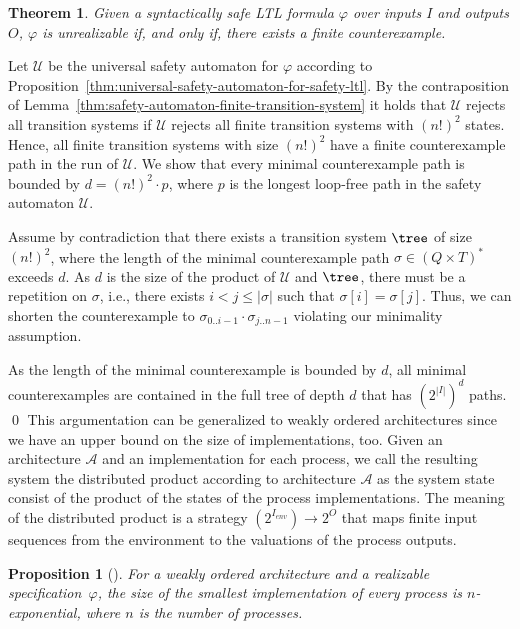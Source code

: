 \documentclass{LMCS}
\theoremstyle{plain}\newtheorem{theorem}[thm]{Theorem}
\theoremstyle{plain}\newtheorem{lemma}[thm]{Lemma}
\theoremstyle{plain}\newtheorem{proposition}[thm]{Proposition}
\theoremstyle{plain}\newtheorem{corollary}[thm]{Corollary}
\theoremstyle{definition}\newtheorem{definition}{Definition}[section]
\begin{document}
\begin{theorem} \label{thm:completeness_full_informed_synthesis}
  Given a syntactically safe LTL formula $\varphi$ over inputs $I$ and outputs $O$, $\varphi$ is unrealizable if, and only if, there exists a finite counterexample.
\end{theorem}
\proof
  Let $\mathcal{U}$ be the universal safety automaton for $\varphi$
  according to Proposition~\ref{thm:universal-safety-automaton-for-safety-ltl}.
  By the contraposition of Lemma~\ref{thm:safety-automaton-finite-transition-system} it holds that $\mathcal{U}$ rejects all transition systems if $\mathcal{U}$ rejects all finite transition systems with $(n!)^2$ states.
  Hence, all finite transition systems with size $(n!)^2$ have a finite counterexample path in the run of $\mathcal{U}$.
  We show that every minimal counterexample path is bounded by $d = (n!)^2 \cdot p$, where $p$ is the longest loop-free path in the safety automaton $\mathcal{U}$.
  
  Assume by contradiction that there exists a transition system $\tree$ of size $(n!)^2$, where the length of the minimal counterexample path $\sigma \in (Q \times T)^*$ exceeds $d$.
  As $d$ is the size of the product of $\mathcal{U}$ and $\tree$, there must be a repetition on $\sigma$, i.e., there exists $i < j \leq |\sigma|$ such that $\sigma[i] = \sigma[j]$.
  Thus, we can shorten the counterexample to $\sigma_{0 .. i-1} \cdot \sigma_{j .. n-1}$ violating our minimality assumption.
  
  As the length of the minimal counterexample is bounded by $d$, all minimal counterexamples are contained in the full tree of depth $d$ that has $(2^{|I|})^d$ paths.
\qed\noindent
This argumentation can be generalized to weakly ordered architectures since we have an upper bound on the size of implementations, too.
Given an architecture $\mathcal{A}$ and an implementation for each process, we call the resulting system the distributed product according to architecture $\mathcal{A}$ as the system state consist of the product of the states of the process implementations.
The meaning of the distributed product is a strategy $(2^{I_\mathit{env}}) \rightarrow 2^O$ that maps finite input sequences from the environment to the valuations of the process outputs.
\begin{proposition}[\hspace{-0.3pt}\cite{DBLP:conf/lics/FinkbeinerS05}] \label{thm:bound_distributed_realizability}
  For a weakly ordered  architecture and a realizable specification~$\varphi$, the size of the smallest implementation of every process is $n$-exponential, where $n$ is the number of processes.
\end{proposition}
\end{document}
